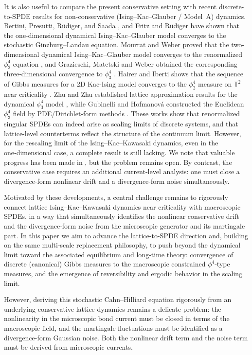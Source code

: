 \documentclass{article}
\begin{document}
It is also useful to compare the present conservative setting with recent discrete-to-SPDE results for non-conservative (Ising--Kac--Glauber / Model~A) dynamics.
Bertini, Presutti, Rüdiger, and Saada \cite{bertini1994}, and Fritz and  Rüdiger \cite{fritz1995} have shown that the one-dimensional dynamical Ising–Kac–Glauber model converges to the stochastic Ginzburg–Landau equation.
Mourrat and Weber proved that the two-dimensional dynamical Ising--Kac--Glauber model converges to the
renormalized \(\phi^4_2\) equation \cite{MW0217}, and Grazieschi, Matetski and Weber obtained the
corresponding three-dimensional convergence to \(\phi^4_3\) \cite{GMW2025}.
Hairer and Iberti shows that the sequence of Gibbs measures for a 2D Kac-Ising model converges to the $\phi^4_2$ measure on $\mathbb T^2$ near criticality  \cite{Hairer2018}.
Zhu and Zhu established lattice approximation results for the dynamical \(\phi^4_3\) model
\cite{ZZ18}, while Gubinelli and Hofmanov{\'a} constructed the Euclidean \(\phi^4_3\) field by PDE/Dirichlet-form methods \cite{GH21}.
These works show that renormalized singular SPDEs can indeed arise as scaling limits of discrete systems, and that lattice-level counterterms reflect the structure of the continuum limit.
However, for the rescaling limit of the Ising–Kac–Kawasaki dynamics, even in the one‑dimensional case, a complete result is still lacking. We note that valuable progress has been made in \cite{Ibetri2018}, but the problem remains open.
By contrast, the conservative case requires an additional current-level analysis:
one must close a divergence-form nonlinear drift and a divergence-form noise simultaneously. 

Motivated by these developments, a central challenge remains to rigorously connect lattice Ising--Kac--Kawasaki dynamics near criticality with macroscopic SPDEs, in a way that simultaneously identifies the nonlinear conservative drift and the
divergence-form noise from the microscopic generator and its martingale part.
In this paper we aim to advance the lattice-to-SPDE direction and, building on the same multi-scale replacement philosophy, to push beyond the dynamical limit toward the associated
equilibrium and long-time theory: convergence of discrete (canonical) Gibbs measures to the macroscopic constrained $\phi^4$-type measures, and the emergence of reversibility and ergodic behavior in the scaling limit.

However, deriving this stochastic Cahn--Hilliard equation rigorously from an underlying conservative lattice dynamics remains a delicate problem: the nonlinearity in the
microscopic bond current must be closed in terms of the macroscopic field, and the martingale fluctuations must be identified as a divergence-form Gaussian noise.
Both the nonlinear drift term and the noise term must be derived from microscopic currents.
\end{document}
